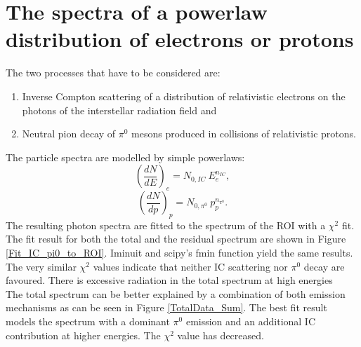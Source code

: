 \documentclass[a4paper]{article}
\begin{document}
\section{The spectra of a powerlaw distribution of electrons or protons}
The two processes that have to be considered are:
\begin{enumerate}
\item Inverse Compton scattering of a distribution of relativistic electrons on the photons of the interstellar radiation field and
\item Neutral pion decay of $\pi^0$ mesons produced in collisions of relativistic protons.
\end{enumerate}
The particle spectra are modelled by simple powerlaws:
$$\left(\frac{dN}{dE}\right)_e = N_{0,IC}\ E_e^{n_{IC}},$$ 
$$\left(\frac{dN}{dp}\right)_p = N_{0,\pi^0}\ p_p^{n_{\pi^0}}.$$
The resulting photon spectra are fitted to the spectrum of the ROI with a $\chi^2$ fit. The fit result for both the total and the residual spectrum are shown in Figure \ref{Fit_IC_pi0_to_ROI}. Iminuit and scipy's fmin function yield the same results. The very similar $\chi^2$ values indicate that neither IC scattering nor $\pi^0$ decay are favoured. There is excessive radiation in the total spectrum at high energies\\
The total spectrum can be better explained by a combination of both emission mechanisms as can be seen in Figure \ref{TotalData_Sum}. The best fit result models the spectrum with a dominant $\pi^0$ emission and an additional IC contribution at higher energies. The $\chi^2$ value has decreased.
\end{document}
